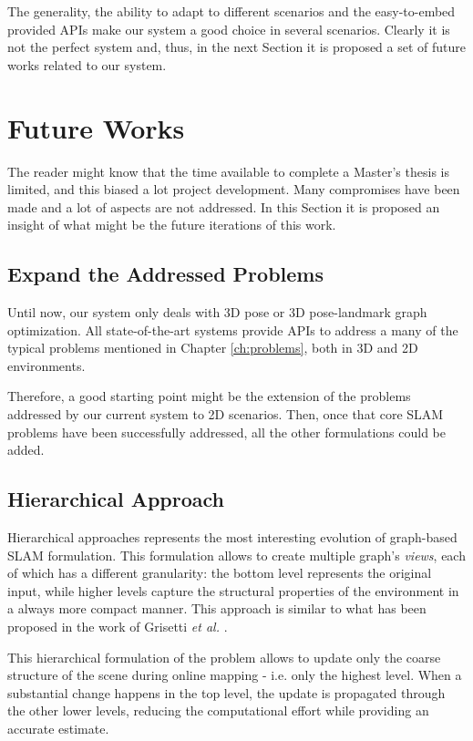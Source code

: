 \noindent The generality, the ability to adapt to different scenarios and the easy-to-embed provided APIs make our system a good choice in several scenarios. Clearly it is not the perfect system and, thus, in the next Section it is proposed a set of future works related to our system.

\section{Future Works}\label{sec:future_works}
The reader might know that the time available to complete a Master's thesis is limited, and this biased a lot project development. Many compromises have been made and a lot of aspects are not addressed. In this Section it is proposed an insight of what might be the future iterations of this work.

\subsection{Expand the Addressed Problems}
Until now, our system only deals with 3D pose or 3D pose-landmark graph optimization. All state-of-the-art systems provide APIs to address a many of the typical problems mentioned in Chapter \ref{ch:problems}, both in 3D and 2D environments.

Therefore, a good starting point might be the extension of the problems addressed by our current system to 2D scenarios. Then, once that core SLAM problems have been successfully addressed, all the other formulations could be added.

\subsection{Hierarchical Approach}
Hierarchical approaches represents the most interesting evolution of graph-based SLAM formulation. This formulation allows to create multiple graph's \textit{views}, each of which has a different granularity: the bottom level represents the original input, while higher levels capture the structural properties of the environment in a always more compact manner. This approach is similar to what has been proposed in the work of Grisetti \textit{et al.} \cite{grisetti2010hogman}.

This hierarchical formulation of the problem allows to update only the coarse structure of the scene during online mapping - i.e. only the highest level. When a substantial change happens in the top level, the update is propagated through the other lower levels, reducing the computational effort while providing an accurate estimate.

